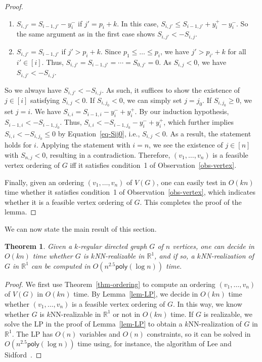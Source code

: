 \documentclass[11pt]{article}
\newtheorem{theorem}{Theorem}
\begin{document}
\begin{proof}
\begin{enumerate}
    By our induction hypothesis, $S_{i-1,j'} < -S_{i-1,j}$.
    Thus, $S_{i,j'} < -S_{i-1,j} + y_i^+ - y_i^-$.
    By Equation~\ref{eq-Sij0}, this implies $S_{i,j'} < -S_{i,j}$.
    \item $S_{i,j'} = S_{i-1,j'}-y_i^-$ if $j' = p_i+k$.
    In this case, $S_{i,j'} \leq S_{i-1,j'} + y_i^+ - y_i^-$.
    So the same argument as in the first case shows $S_{i,j'} < -S_{i,j}$.
    \item $S_{i,j'} = S_{i-1,j'}$ if $j' > p_i+k$.
    Since $p_1 \leq \dots \leq p_i$, we have $j' > p_{i'} + k$ for all $i' \in [i]$.
    Thus, $S_{i,j'} = S_{i-1,j'} = \cdots = S_{0,j'} = 0$.
    As $S_{i,j} < 0$, we have $S_{i,j'} < -S_{i,j}$.
\end{enumerate}
So we always have $S_{i,j'} < -S_{i,j}$.
As such, it suffices to show the existence of $j \in [i]$ satisfying $S_{i,j} < 0$.
If $S_{i,j_0} < 0$, we can simply set $j = j_0$.
If $S_{i,j_0} \geq 0$, we set $j = i$.
We have $S_{i,i} = S_{i-1,i} - y_i^- + y_i^+$.
By our induction hypothesis, $S_{i-1,i} < -S_{i-1,j_0}$.
Thus, $S_{i,i} < -S_{i-1,j_0} - y_i^- + y_i^+$, which further implies $S_{i,i} < - S_{i,j_0} \leq 0$ by Equation~\ref{eq-Sij0}, i.e., $S_{i,j} < 0$.
As a result, the statement holds for $i$.
Applying the statement with $i = n$, we see the existence of $j \in [n]$ with $S_{n,j} < 0$, resulting in a contradiction.
Therefore, $(v_1,\dots,v_n)$ is a feasible vertex ordering of $G$ iff it satisfies condition~1 of Observation~\ref{obs-vertex}.

Finally, given an ordering $(v_1,\dots,v_n)$ of $V(G)$, one can easily test in $O(kn)$ time whether it satisfies condition~1 of Observation~\ref{obs-vertex}, which indicates whether it is a feasible vertex ordering of $G$.
This completes the proof of the lemma.
\end{proof}
\noindent
We can now state the main result of this section.


\begin{theorem} \label{thm:final}
Given a $k$-regular directed graph $G$ of $n$ vertices, one can decide in $O(kn)$ time whether $G$ is $k$NN-realizable in $\mathbb{R}^1$, and if so, a $k$NN-realization of $G$ in $\mathbb{R}^1$ can be computed in $O(n^{2.5} \mathsf{poly}(\log n))$ time.
\end{theorem}


\begin{proof}
We first use Theorem~\ref{thm-ordering} to compute an ordering $(v_1,\dots,v_n)$ of $V(G)$ in $O(kn)$ time. By Lemma~\ref{lem-LP}, we decide in $O(kn)$ time whether $(v_1,\dots,v_n)$ is a feasible vertex ordering of $G$. In this way, we know whether $G$ is $k$NN-realizable in $\mathbb{R}^1$ or not in $O(kn)$ time. If $G$ is realizable, we solve the LP in the proof of Lemma~\ref{lem-LP} to obtain a $k$NN-realization of $G$ in $\mathbb{R}^1$. The LP has $O(n)$ variables and $O(n)$ constraints, so it can be solved in $O(n^{2.5} \mathsf{poly} (\log n))$ time using, for instance, the algorithm of Lee and Sidford~\cite{lee2015efficient}.
\end{proof}
\end{document}
